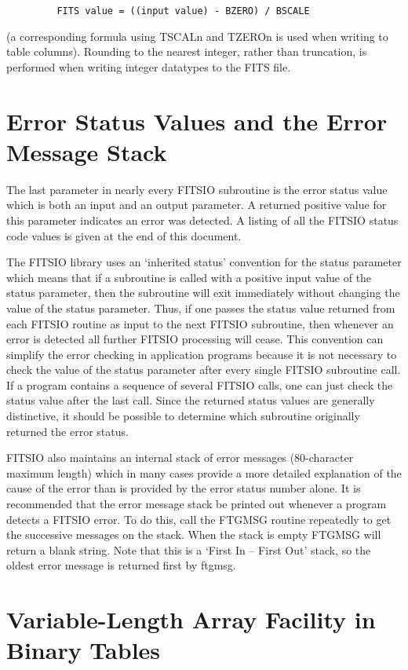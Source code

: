 \documentclass[11pt]{book}
\begin{document}
\begin{verbatim}
         FITS value = ((input value) - BZERO) / BSCALE
\end{verbatim}
(a corresponding formula using TSCALn and TZEROn is used when
writing to table columns).  Rounding to the nearest integer, rather
than truncation, is performed when writing integer datatypes to the
FITS file.


\section{Error Status Values and the Error Message Stack}

The last parameter in nearly every FITSIO subroutine is the error
status value which is both an input and an output parameter.  A
returned positive value for this parameter indicates an error was
detected.  A listing of all the FITSIO status code values is given at
the end of this document.

The FITSIO library uses an `inherited status' convention for the status
parameter which means that if a subroutine is called with a positive
input value of the status parameter, then the subroutine will exit
immediately without changing the value of the status parameter.  Thus,
if one passes the status value returned from each FITSIO routine as
input to the next FITSIO subroutine, then whenever an error is detected
all further FITSIO processing will cease.  This convention can simplify
the error checking in application programs because it is not necessary
to check the value of the status parameter after every single FITSIO
subroutine call.  If a program contains a sequence of several FITSIO
calls, one can just check the status value after the last call.  Since
the returned status values are generally distinctive, it should be
possible to determine which subroutine originally returned the error
status.

FITSIO also maintains an internal stack of error messages (80-character
maximum length) which in many cases provide a more detailed explanation
of the cause of the error than is provided by the error status number
alone. It is recommended that the error message stack be printed out
whenever a program detects a FITSIO error. To do this, call the FTGMSG
routine repeatedly to get the successive messages on the stack. When the
stack is empty FTGMSG will return a blank string. Note that this is a
`First In -- First Out' stack, so the oldest error message is returned
first by ftgmsg.


\section{Variable-Length Array Facility in Binary Tables}
\end{document}
